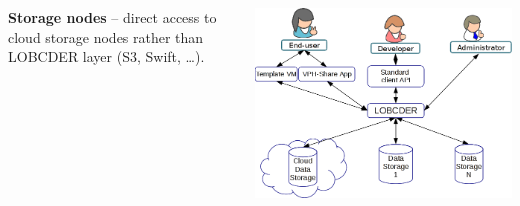 \documentclass[compress]{beamer}
\begin{document}
\begin{frame}
\begin{exampleblock}{}
	\begin{columns}
		\begin{column}{0.6\textwidth}
			\textbf{Storage nodes} -- direct access to cloud storage nodes rather than LOBCDER layer (S3, Swift, \ldots).
		\end{column}
		\begin{column}{0.3\textwidth}
			\centering
			\includegraphics[scale=0.12]{img/lobcder.png}
		\end{column}
	\end{columns}
\end{exampleblock}
\end{frame}
\end{document}
